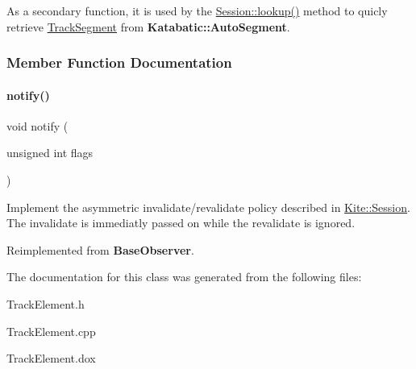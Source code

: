 As a secondary function, it is used by the \hyperlink{classKite_1_1Session_a1728621b96081c32fb7bfb18a0ebfad3}{Session\+::lookup()} method to quicly retrieve \hyperlink{classKite_1_1TrackSegment}{Track\+Segment} from \textbf{ Katabatic\+::\+Auto\+Segment}. 

\subsubsection{Member Function Documentation}
\mbox{\label{classKite_1_1SegmentObserver_a52e577fb0c4f2e3650928334fb621c2f}} 
\paragraph{\texorpdfstring{notify()}{notify()}}
{\footnotesize\ttfamily void notify (\begin{DoxyParamCaption}\item[{unsigned int}]{flags }\end{DoxyParamCaption})\hspace{0.3cm}{\ttfamily [virtual]}}

Implement the asymmetric invalidate/revalidate policy described in \hyperlink{classKite_1_1Session}{Kite\+::\+Session}. The invalidate is immediatly passed on while the revalidate is ignored. 

Reimplemented from \textbf{ Base\+Observer}.



The documentation for this class was generated from the following files\+:\begin{DoxyCompactItemize}
\item 
Track\+Element.\+h\item 
Track\+Element.\+cpp\item 
Track\+Element.\+dox\end{DoxyCompactItemize}
